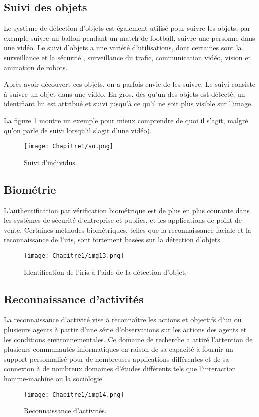 \subsection{Suivi des objets}
Le système de détection d'objets est également utilisé pour suivre les objets, par exemple suivre un ballon pendant un match de football, suivre une personne dans une vidéo. Le suivi d'objets a une variété d'utilisations, dont certaines sont la surveillance et la sécurité , surveillance du trafic, communication vidéo, vision et animation de robots.

Après avoir découvert ces objets, on a parfois envie de les suivre. Le suivi consiste à suivre un objet dans une vidéo. En gros, dès qu'un des objets est détecté, un identifiant lui est attribué et suivi jusqu'à ce qu'il ne soit plus visible sur l'image.

La figure \ref{so} montre un exemple pour mieux comprendre de quoi il s'agit, malgré qu'on parle de suivi lorsqu'il s'agit d'une vidéo).

\begin{figure}[H]
\centering
\texttt{[image: Chapitre1/so.png]}
\caption{Suivi d'individus.}
\label{so}
\end{figure}     
     \subsection{Biométrie}
       
     L'authentification par vérification biométrique est de plus en plus courante dans les systèmes de sécurité d'entreprise et publics,  et les applications de point de vente. Certaines méthodes biométriques, telles que la reconnaissance faciale et la reconnaissance de l'iris, sont fortement basées sur la détection d'objets.
     \begin{figure}[H]
          \centering
          \texttt{[image: Chapitre1/img13.png]}
          \caption{Identification de l'iris à l'aide de la détection d'objet.}
          \label{img13}
          \end{figure}
     
     \subsection{Reconnaissance d'activités}
     La reconnaissance d'activité vise à reconnaître les actions et objectifs d'un ou plusieurs agents à partir d'une série d'observations sur les actions des agents et les conditions environnementales. Ce domaine de recherche a attiré l'attention de plusieurs communautés informatiques en raison de sa capacité à fournir un support personnalisé pour de nombreuses applications différentes et de sa connexion à de nombreux domaines d'études différents tels que l'interaction homme-machine ou la sociologie.
     \begin{figure}[H]
          \centering
          \texttt{[image: Chapitre1/img14.png]}
          \caption{Reconnaissance d'activités.}
          \label{img14}
          \end{figure}


